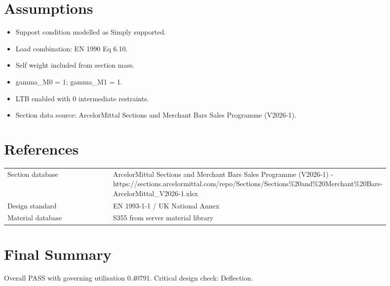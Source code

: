\documentclass[11pt,a4paper]{article}
\begin{document}
\section{Assumptions}
\begin{itemize}
\item Support condition modelled as Simply supported.
\item Load combination: EN 1990 Eq 6.10.
\item Self weight included from section mass.
\item gamma\_M0 = 1; gamma\_M1 = 1.
\item LTB enabled with 0 intermediate restraints.
\item Section data source: ArcelorMittal Sections and Merchant Bars Sales Programme (V2026-1).
\end{itemize}

\section{References}
\begin{longtable}{p{0.28\linewidth}p{0.62\linewidth}}
Section database & ArcelorMittal Sections and Merchant Bars Sales Programme (V2026-1) - https://sections.arcelormittal.com/repo/Sections/Sections\%20and\%20Merchant\%20Bars-ArcelorMittal\_V2026-1.xlsx \\
Design standard & EN 1993-1-1 / UK National Annex \\
Material database & S355 from server material library \\
\end{longtable}

\section{Final Summary}
Overall PASS with governing utilisation 0.40791. Critical design check: Deflection.
\end{document}
